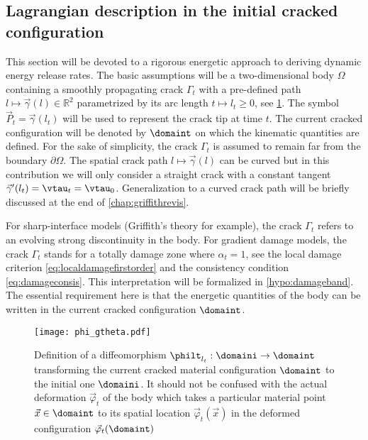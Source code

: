 \subsection{Lagrangian description in the initial cracked configuration}
This section will be devoted to a rigorous energetic approach to deriving dynamic energy release rates. The basic assumptions will be a two-dimensional body $\Omega$ containing a smoothly propagating crack $\Gamma_t$ with a pre-defined path $l\mapsto\vec{\gamma}(l)\in\mathbb{R}^2$ parametrized by its arc length $t\mapsto l_t\geq 0$, see \cref{fig:philt}. The symbol $\vec{P}_t=\vec{\gamma}(l_t)$ will be used to represent the crack tip at time $t$. The current cracked configuration will be denoted by $\domaint$ on which the kinematic quantities are defined. For the sake of simplicity, the crack $\Gamma_t$ is assumed to remain far from the boundary $\partial\Omega$. The spatial crack path $l\mapsto\vec{\gamma}(l)$ can be curved but in this contribution we will only consider a straight crack with a constant tangent $\vec{\gamma}'(l_t)=\vtau_t=\vtau_0$. Generalization to a curved crack path will be briefly discussed at the end of \cref{chap:griffithrevis}.
\begin{remark}
For sharp-interface models (Griffith's theory for example), the crack $\Gamma_t$ refers to an evolving strong discontinuity in the body. For gradient damage models, the crack $\Gamma_t$ stands for a totally damage zone where $\alpha_t=1$, see the local damage criterion \eqref{eq:localdamagefirstorder} and the consistency condition \eqref{eq:damageconsis}. This interpretation will be formalized in \cref{hypo:damageband}. The essential requirement here is that the energetic quantities of the body can be written in the current cracked configuration $\domaint$.
\end{remark}
\begin{figure}[htbp]
\centering
\texttt{[image: phi\_gtheta.pdf]}
\caption{Definition of a diffeomorphism $\philt_{l_t}:\domaini\to\domaint$ transforming the current cracked material configuration $\domaint$ to the initial one $\domaini$. It should not be confused with the actual deformation $\vec{\varphi}_t$ of the body which takes a particular material point $\vec{x}\in\domaint$ to its spatial location $\vec{\varphi}_t(\vec{x})$ in the deformed configuration $\vec{\varphi}_t(\domaint)$} \label{fig:philt}
\end{figure}

